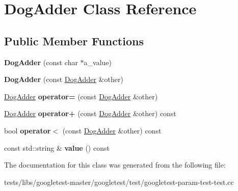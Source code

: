 \hypertarget{classDogAdder}{}\section{Dog\+Adder Class Reference}
\label{classDogAdder}
\subsection*{Public Member Functions}
\begin{DoxyCompactItemize}
\item 
\mbox{\label{classDogAdder_a7fd76a2078834dc255c7dd7ac7c58f32}} 
{\bfseries Dog\+Adder} (const char $\ast$a\+\_\+value)
\item 
\mbox{\label{classDogAdder_a35bb24b649b63f38784dcb44d55c4d94}} 
{\bfseries Dog\+Adder} (const \hyperlink{classDogAdder}{Dog\+Adder} \&other)
\item 
\mbox{\label{classDogAdder_a13bd773069c15b083f876b8afd512247}} 
\hyperlink{classDogAdder}{Dog\+Adder} {\bfseries operator=} (const \hyperlink{classDogAdder}{Dog\+Adder} \&other)
\item 
\mbox{\label{classDogAdder_ad667166cdafb4352396e910faf09a55f}} 
\hyperlink{classDogAdder}{Dog\+Adder} {\bfseries operator+} (const \hyperlink{classDogAdder}{Dog\+Adder} \&other) const
\item 
\mbox{\label{classDogAdder_a6d87d3ee06c0167e7552ba83daa629e7}} 
bool {\bfseries operator$<$} (const \hyperlink{classDogAdder}{Dog\+Adder} \&other) const
\item 
\mbox{\label{classDogAdder_a76bb9e42f79e9d4adacd9e48a3a3c9fb}} 
const std\+::string \& {\bfseries value} () const
\end{DoxyCompactItemize}


The documentation for this class was generated from the following file\+:\begin{DoxyCompactItemize}
\item 
tests/libs/googletest-\/master/googletest/test/googletest-\/param-\/test-\/test.\+cc\end{DoxyCompactItemize}
